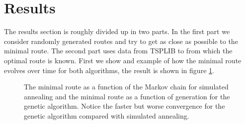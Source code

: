 \documentclass[10pt,a4paper]{article}
\begin{document}
\section{Results}
The results section is roughly divided up in two parts. In the first part we consider randomly generated routes and try to get as close as possible to the minimal route. The second part uses data from TSPLIB to from which the optimal route is known. First we show and example of how the minimal route evolves over time for both algorithms, the result is shown in figure \ref{fig:data}.

\begin{figure}[H]
  \caption{The minimal route as a function of the Markov chain for simulated annealing and the minimal route as a function of generation for the genetic algorithm. Notice the faster but worse convergence for the genetic algorithm compared with simulated annealing. }
  \label{fig:data}
\end{figure}
\end{document}
